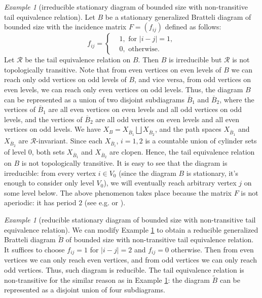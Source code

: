 \documentclass[11pt, twoside]{amsart}
\theoremstyle{definition}
\theoremstyle{remark}
\newtheorem{example}[definition]{Example}
\theoremstyle{plain}
\def\ov{\overline}
\def\tl{\widetilde}
\numberwithin{equation}{section}
\begin{document}
\begin{example}[irreducible stationary diagram of bounded size with non-transitive tail equivalence relation]\label{ex:bdd_irred_nontrans}
Let $B$ be a stationary generalized Bratteli diagram of bounded size with the incidence matrix $F = (f_{ij})$ defined as follows:
$$
f_{ij} = 
\left\{
\begin{aligned}
& 1, \mbox{ for } |i - j| = 1,\\
& 0, \mbox{ otherwise. }
\end{aligned}
\right.
$$
Let $\mathcal{R}$ be the tail equivalence relation on $B$.
Then $B$ is irreducible but $\mathcal{R}$ is not topologically transitive. Note that from even vertices on even levels of $B$ we can reach only odd vertices on odd levels of $B$, and vice versa, from odd vertices on even levels, we can reach only even vertices on odd levels. Thus, the diagram $B$ can be represented as a union of two disjoint subdiagrams $\ov B_{1}$ and $\ov B_2$, where the vertices of $\ov B_{1}$ are all even vertices on even levels and all odd vertices on odd levels, and the vertices of $\ov B_2$ are all odd vertices on even levels and all even vertices on odd levels. We have $X_B = X_{\ov B_{1}} \bigsqcup X_{\ov B_2}$, and the path spaces $X_{\ov B_{1}}$ and $X_{\ov B_2}$ are  $\mathcal{R}$-invariant. Since each $X_{\ov B_i}$, $i = 1,2$ is a countable union of cylinder sets of level $0$, both sets $X_{\ov B_{1}}$ and $X_{\ov B_2}$ are clopen.
Hence, the tail equivalence relation on $B$ is not topologically transitive. It is easy to see that the diagram is irreducible: from every vertex $i \in V_0$ (since the diagram $B$ is stationary, it's enough to consider only level $V_0$), we will eventually reach arbitrary vertex $j$ on some level below. The above phenomenon takes place because the matrix $F$ is not aperiodic: it has period $2$ (see e.g. \cite[Chapter 7]{Kitchens1998} or \cite[Appendix A]{BezuglyiJorgensenKarpelSanadhya2025}).
\end{example}

\begin{example}[reducible stationary diagram of bounded size with non-transitive tail equivalence relation]\label{ex:bdd_red_nontrans} We can modify Example \ref{ex:bdd_irred_nontrans} to obtain a reducible generalized Bratteli diagram $\tl B$ of bounded size with non-transitive tail equivalence relation. It suffices to choose $f_{ij} = 1$ for $|i-j| = 2$ and $f_{ij} = 0$ otherwise. Then from even vertices we can only reach even vertices, and from odd vertices we can only reach odd vertices. Thus, such diagram is reducible. The tail equivalence relation is non-transitive for the similar reason as in Example \ref{ex:bdd_irred_nontrans}: the diagram $\tl B$ can be represented as a disjoint union of four subdiagrams.    
\end{example}
\end{document}
